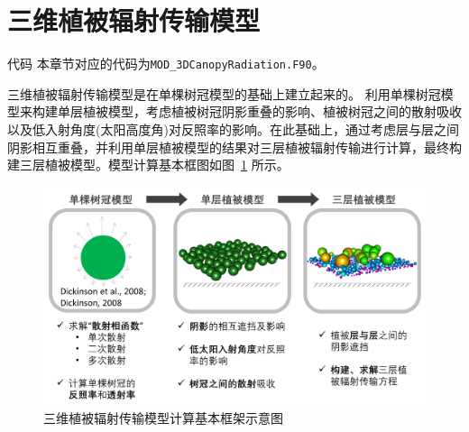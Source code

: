 \section{三维植被辐射传输模型}\label{三维植被辐射传输模型}
\begin{mymdframed}{代码}
  本章节对应的代码为\texttt{MOD\_3DCanopyRadiation.F90}。
\end{mymdframed}

三维植被辐射传输模型\citep{yuan20143d}是在单棵树冠模型\citep{dickinson2008determination,dickinson2008three}的基础上建立起来的。
利用单棵树冠模型来构建单层植被模型，考虑植被树冠阴影重叠的影响、植被树冠之间的散射吸收以及低入射角度(太阳高度角)对反照率的影响。在此基础上，通过考虑层与层之间阴影相互重叠，并利用单层植被模型的结果对三层植被辐射传输进行计算，最终构建三层植被模型。模型计算基本框图如图~\ref{fig:三维植被辐射传输模型的基本框架} 所示。
{
  \begin{figure}[htbp]
    \centering
    \includegraphics[width=0.95\columnwidth]{Figures/辐射过程及辐射通量计算/三维植被辐射传输模型基本框架.png}
    \caption{三维植被辐射传输模型计算基本框架示意图}
    \label{fig:三维植被辐射传输模型的基本框架}
  \end{figure}
}


